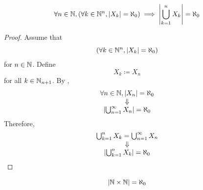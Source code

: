 \bigskip

\begin{corollary} \label{an:cor:finite-union-of-countable-sets-is-countable}
    \[
    \forall n \in \N, \paren*{\forall k \in \N^{n}, \abs*{X_{k}} = \aleph_{0}}
    \implies \abs*{\bigcup_{k = 1}^{n} X_{k}} = \aleph_{0}
    \]
\end{corollary}

\begin{proof}
    Assume that
    \[
    \paren*{\forall k \in \N^{n}, \abs*{X_{k}} = \aleph_{0}}
    \]
    for $n \in \N$. Define
    \[
    X_{k} \coloneqq X_{n}
    \]
    for all $k \in \N_{n + 1}$. By ,
    \[
    \begin{array}{c}
        \forall n \in \N, \abs*{X_{n}} = \aleph_{0} \\
        \Downarrow \\
        \abs*{\bigcup_{n = 1}^{\infty} X_{n}} = \aleph_{0}
    \end{array}
    \]
    Therefore,
    \[
    \begin{array}{c}
        \bigcup_{k = 1}^{n} X_{k} = \bigcup_{n = 1}^{\infty} X_{n} \\
        \Downarrow \\
        \abs*{\bigcup_{k = 1}^{n} X_{k}} = \aleph_{0}
    \end{array}
    \]
\end{proof}

\bigskip

\begin{lemma} \label{an:lem:N-times-N-is-countable}
    \[
    \abs*{\N \times \N} = \aleph_{0}
    \]
\end{lemma}
